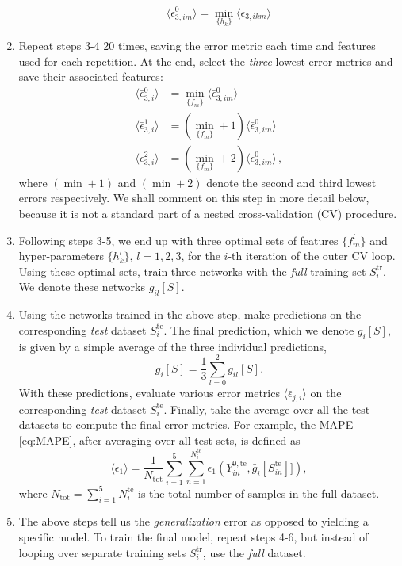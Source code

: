 \documentclass[%
 preprint,
 superscriptaddress,
 amsmath,amssymb,
longbibliography,
]{revtex4-2}
\newcommand{\avg}[1]{\langle #1 \rangle}
\begin{document}
\begin{enumerate}
\begin{enumerate}[i]
\begin{equation}
            \avg{\bar{\epsilon}^0_{3,im}} = \min_{\{h_k\}} \avg{\epsilon_{3,ikm}}
        \end{equation}
    \end{enumerate}
    \item Repeat steps 3-4 20 times, saving the error metric each time and features used for each repetition. At the end, select the \emph{three} lowest error metrics and save their associated features:
    \begin{align}
        \avg{\bar{\epsilon}_{3,i}^0} &= \min_{\{f_m\}}  \avg{\bar{\epsilon}^0_{3,im}} \\
         \avg{\bar{\epsilon}_{3,i}^1} &= (\min_{\{f_m\}}+1) \avg{\bar{\epsilon}^0_{3,im}}  \\        
         \avg{\bar{\epsilon}_{3,i}^2} &= (\min_{\{f_m\}}+2) \avg{\bar{\epsilon}^0_{3,im}} \,, 
    \end{align}
     where $(\min+1)$ and $(\min+2)$ denote the second and third lowest errors respectively. We shall comment on this step in more detail below, because it is not a standard part of a nested cross-validation (CV) procedure.
    \item Following steps 3-5, we end up with three optimal sets of features $\{f_m^l\}$ and hyper-parameters $\{h_k^l\}$, $l=1,2,3$, for the $i$-th iteration of the outer CV loop. Using these optimal sets, train three networks with the \emph{full} training set $S_i^\textrm{tr}$. We denote these networks $g_{il}[S]$.
    \item Using the networks trained in the above step, make predictions on the corresponding \emph{test} dataset $S_i^{\textrm{te}}$. The final prediction, which we denote $\bar{g}_i[S]$, is given by a simple average of the three individual predictions,
    \begin{equation}
        \bar{g}_i[S] = \frac{1}{3} \sum_{l=0}^2 g_{il}[S].
    \end{equation}
    With these predictions, evaluate various error metrics $\avg{\bar{\epsilon}_{j,i}}$ on the corresponding \emph{test} dataset $S_i^{\textrm{te}}$. Finally, take the average over all the test datasets to compute the final error metrics.
For example, the MAPE \eqref{eq:MAPE}, after averaging over all test sets, is defined as
    \begin{equation}
        \avg{\bar{\epsilon}_{1}} = \frac{1}{N_\textrm{tot}}\sum_{i=1}^5 \sum_{n=1}^{N_i^\textrm{te}} \epsilon_1\left(Y^{0,\textrm{te}}_{in}, \bar{g}_i[S^\textrm{te}_{in}]]\right),
   \end{equation}
   where $N_\textrm{tot}=\sum_{i=1}^{5}N_i^\textrm{te}$ is the total number of samples in the full dataset.
   \item The above steps tell us the \emph{generalization} error as opposed to yielding a specific model. To train the final model, repeat steps 4-6, but instead of looping over separate training sets $S_i^\textrm{tr}$, use the \emph{full} dataset.
\end{enumerate}
\end{document}
